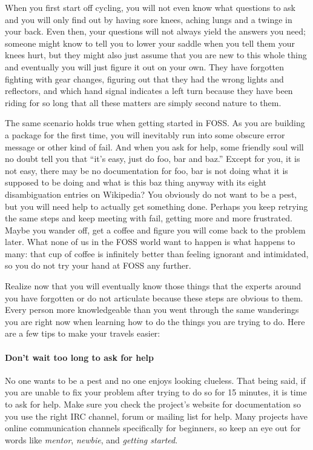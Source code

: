 When you first start off cycling, you will not even know what questions to ask
and you will only find out by having sore knees, aching lungs and a twinge in your back. Even then, your questions will not always yield the answers you need;
someone might know to tell you to lower your saddle when you tell them your
knees hurt, but they might also just assume that you are new to this whole thing
and eventually you will just figure it out on your own. They have forgotten
fighting with gear changes, figuring out that they had the wrong lights and
reflectors, and which hand signal indicates a left turn because they have been
riding for so long that all these matters are simply second nature to them.

The same scenario holds true when getting started in FOSS. As you are building a
package for the first time, you will inevitably run into some obscure error
message or other kind of fail. And when you ask for help, some friendly soul
will no doubt tell you that ``it’s easy, just do foo, bar and baz.'' Except for
you, it is not easy, there may be no documentation for foo, bar is not doing
what it is supposed to be doing and what is this baz thing anyway with its eight
disambiguation entries on Wikipedia? You obviously do not want to be a pest, but
you will need help to actually get something done. Perhaps you keep retrying the
same steps and keep meeting with fail, getting more and more frustrated. Maybe
you wander off, get a coffee and figure you will come back to the problem later.
What none of us in the FOSS world want to happen is what happens to many: that
cup of coffee is infinitely better than feeling ignorant and intimidated, so you
do not try your hand at FOSS any further.

Realize now that you will eventually know those things that the experts around
you have forgotten or do not articulate because these steps are obvious to them.
Every person more knowledgeable than you went through the same wanderings you
are right now when learning how to do the things you are trying to do. Here are
a few tips to make your travels easier:

\paragraph*{Don’t wait too long to ask for help} No one wants to be a pest and
no one enjoys looking clueless. That being said, if you are unable to fix your
problem after trying to do so for 15 minutes, it is time to ask for help. Make
sure you check the project’s website for documentation so you use the right IRC
channel, forum or mailing list for help. Many projects have online communication
channels specifically for beginners, so keep an eye out for words like
\textit{mentor}, \textit{newbie}, and \textit{getting started}.

